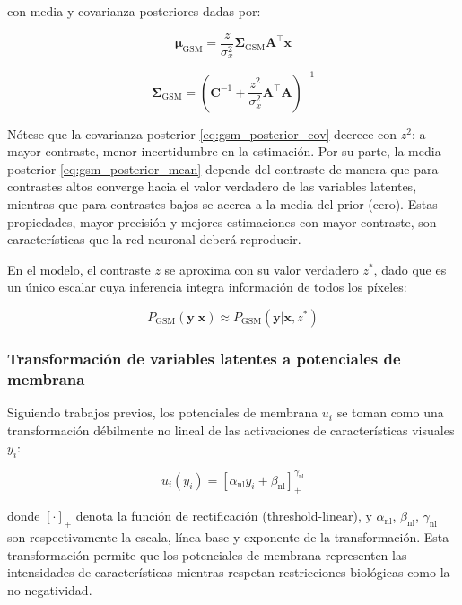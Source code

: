 con media y covarianza posteriores dadas por:

\begin{equation}
\boldsymbol{\mu}_{\text{GSM}} = \frac{z}{\sigma_x^2} \boldsymbol{\Sigma}_{\text{GSM}} \mathbf{A}^\top \mathbf{x}
\label{eq:gsm_posterior_mean}
\end{equation}

\begin{equation}
\boldsymbol{\Sigma}_{\text{GSM}} = \left( \mathbf{C}^{-1} + \frac{z^2}{\sigma_x^2} \mathbf{A}^\top \mathbf{A} \right)^{-1}
\label{eq:gsm_posterior_cov}
\end{equation}

Nótese que la covarianza posterior \eqref{eq:gsm_posterior_cov} decrece con $z^2$: a mayor contraste, menor incertidumbre en la estimación. Por su parte, la media posterior \eqref{eq:gsm_posterior_mean} depende del contraste de manera que para contrastes altos converge hacia el valor verdadero de las variables latentes, mientras que para contrastes bajos se acerca a la media del prior (cero). Estas propiedades, mayor precisión y mejores estimaciones con mayor contraste, son características que la red neuronal deberá reproducir.

En el modelo, el contraste $z$ se aproxima con su valor verdadero $z^*$, dado que es un único escalar cuya inferencia integra información de todos los píxeles:

\begin{equation}
P_{\text{GSM}}(\mathbf{y}|\mathbf{x}) \approx P_{\text{GSM}}(\mathbf{y}|\mathbf{x}, z^*)
\label{eq:gsm_marginal}
\end{equation}

\subsubsection{Transformación de variables latentes a potenciales de membrana}

Siguiendo trabajos previos, los potenciales de membrana $u_i$ se toman como una transformación débilmente no lineal de las activaciones de características visuales $y_i$:

\begin{equation}
u_i(y_i) = \left[ \alpha_{\text{nl}} y_i + \beta_{\text{nl}} \right]_+^{\gamma_{\text{nl}}}
\label{eq:latent_to_membrane}
\end{equation}

donde $[\cdot]_+$ denota la función de rectificación (threshold-linear), y $\alpha_{\text{nl}}$, $\beta_{\text{nl}}$, $\gamma_{\text{nl}}$ son respectivamente la escala, línea base y exponente de la transformación. Esta transformación permite que los potenciales de membrana representen las intensidades de características mientras respetan restricciones biológicas como la no-negatividad.

